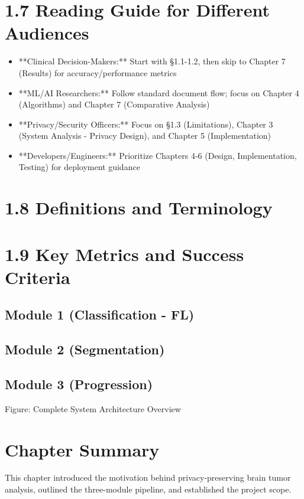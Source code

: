 \section{1.7 Reading Guide for Different Audiences}
\begin{itemize}
  \item **Clinical Decision-Makers:** Start with §1.1-1.2, then skip to Chapter 7 (Results) for accuracy/performance metrics
  \item **ML/AI Researchers:** Follow standard document flow; focus on Chapter 4 (Algorithms) and Chapter 7 (Comparative Analysis)
  \item **Privacy/Security Officers:** Focus on §1.3 (Limitations), Chapter 3 (System Analysis - Privacy Design), and Chapter 5 (Implementation)
  \item **Developers/Engineers:** Prioritize Chapters 4-6 (Design, Implementation, Testing) for deployment guidance
\end{itemize}


\section{1.8 Definitions and Terminology}

\section{1.9 Key Metrics and Success Criteria}

\subsection{Module 1 (Classification - FL)}

\subsection{Module 2 (Segmentation)}

\subsection{Module 3 (Progression)}
Figure: Complete System Architecture Overview


\section{Chapter Summary}
This chapter introduced the motivation behind privacy-preserving brain tumor analysis, outlined the three-module pipeline, and established the project scope.
